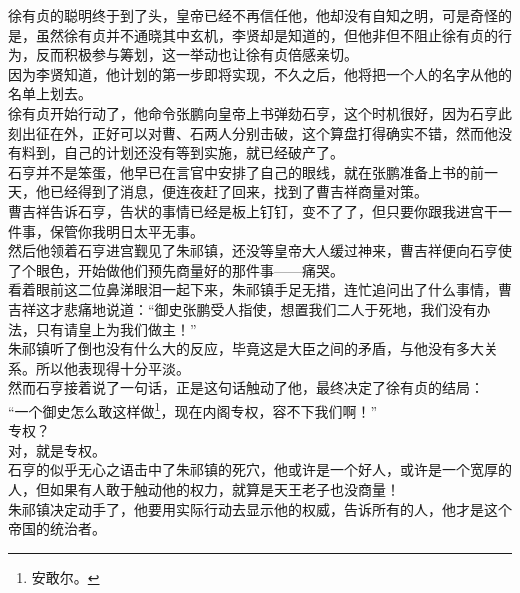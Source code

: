 \begin{multicols}{\theparacolNo}
徐有贞的聪明终于到了头，皇帝已经不再信任他，他却没有自知之明，可是奇怪的是，虽然徐有贞并不通晓其中玄机，李贤却是知道的，但他非但不阻止徐有贞的行为，反而积极参与筹划，这一举动也让徐有贞倍感亲切。\\

因为李贤知道，他计划的第一步即将实现，不久之后，他将把一个人的名字从他的名单上划去。\\

徐有贞开始行动了，他命令张鹏向皇帝上书弹劾石亨，这个时机很好，因为石亨此刻出征在外，正好可以对曹、石两人分别击破，这个算盘打得确实不错，然而他没有料到，自己的计划还没有等到实施，就已经破产了。\\

石亨并不是笨蛋，他早已在言官中安排了自己的眼线，就在张鹏准备上书的前一天，他已经得到了消息，便连夜赶了回来，找到了曹吉祥商量对策。\\

曹吉祥告诉石亨，告状的事情已经是板上钉钉，变不了了，但只要你跟我进宫干一件事，保管你我明日太平无事。\\

然后他领着石亨进宫觐见了朱祁镇，还没等皇帝大人缓过神来，曹吉祥便向石亨使了个眼色，开始做他们预先商量好的那件事——痛哭。\\

看着眼前这二位鼻涕眼泪一起下来，朱祁镇手足无措，连忙追问出了什么事情，曹吉祥这才悲痛地说道：“御史张鹏受人指使，想置我们二人于死地，我们没有办法，只有请皇上为我们做主！”\\

朱祁镇听了倒也没有什么大的反应，毕竟这是大臣之间的矛盾，与他没有多大关系。所以他表现得十分平淡。\\

然而石亨接着说了一句话，正是这句话触动了他，最终决定了徐有贞的结局：\\

“一个御史怎么敢这样做\footnote{安敢尔。}，现在内阁专权，容不下我们啊！”\\

专权？\\

对，就是专权。\\

石亨的似乎无心之语击中了朱祁镇的死穴，他或许是一个好人，或许是一个宽厚的人，但如果有人敢于触动他的权力，就算是天王老子也没商量！\\

朱祁镇决定动手了，他要用实际行动去显示他的权威，告诉所有的人，他才是这个帝国的统治者。\\


\end{multicols}
